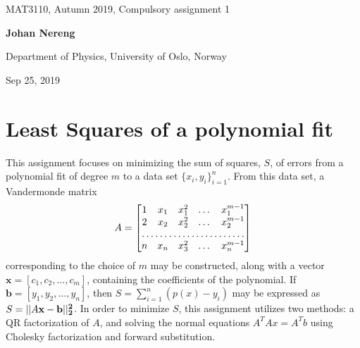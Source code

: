 \documentclass[%
oneside,                 %
final,                   %
10pt]{article}
\begin{document}

\newcommand{\exercisesection}[1]{\subsection*{#1}}






\thispagestyle{empty}

\begin{center}
{\LARGE\bf
\begin{spacing}{1.25}
MAT3110, Autumn 2019, Compulsory
assignment 1
\end{spacing}
}
\end{center}


\begin{center}
{\bf Johan Nereng}
\end{center}

    \begin{center}
\centerline{{\small Department of Physics, University of Oslo, Norway}}
\end{center}
    

\begin{center}
Sep 25, 2019
\end{center}

\vspace{5cm}
\newpage
\section{Least Squares of a polynomial fit}
This assignment focuses on minimizing the sum of squares, $S$, of errors from a polynomial fit of degree $m$ to a data set $\{x_i,y_i\} _{i=1}^n$. From this data set, a Vandermonde matrix
\begin{equation}
A=\begin{bmatrix}
    1       & x_1 & x_1^2 & \dots & x_1^{m-1} \\
    2       & x_2 & x_2^2 & \dots & x_2^{m-1} \\
    \hdotsfor{5} \\
    n       & x_n & x_3^2 & \dots & x_n^{m-1}
\end{bmatrix}
\end{equation}
corresponding to the choice of $m$ may be constructed, along with a vector $\mathbf{x} =[c_1,c_2, \dots,c_m]$, containing the coefficients of the polynomial. If $\mathbf{b}=[y_1,y_2,\dots,y_n]$, then $S=\sum_{i=1}^n (p(x)-y_i)$ may be expressed as $S=||A\bf x - \bf b ||^2_2$. In order to minimize $S$, this assignment utilizes two methods: a QR factorization of $A$, and solving the normal equations $A^TAx=A^Tb$ using Cholesky factorization and forward substitution.
\end{document}
